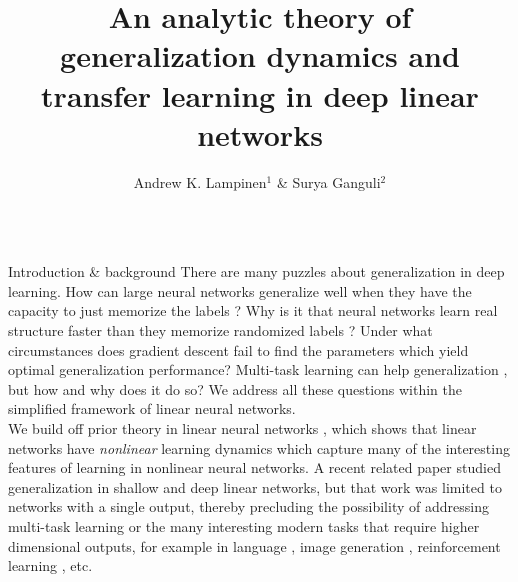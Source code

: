 \documentclass[final]{beamer}
\title{An analytic theory of generalization dynamics and transfer learning in deep linear networks}
\author{Andrew K. Lampinen$^1$ \& Surya Ganguli$^2$}
\institute{$^1$Department of Psychology, $^2$Department of Applied Physics, Stanford University}
\begin{document}

\begin{frame}[t]{}
\vspace{-1.5em}
\begin{columns}

\begin{column}[t]{0.248\textwidth}
\begin{block}{\large Introduction \& background}
\vspace{-0.5em}
There are many puzzles about generalization in deep learning. How can large neural networks generalize well when they have the capacity to just memorize the labels \citep{Zhang2016}? Why is it that neural networks learn real structure faster than they memorize randomized labels \citep{Arpit2017}? Under what circumstances does gradient descent fail to find the parameters which yield optimal generalization performance? Multi-task learning can help generalization \citep[e.g.]{Dong2015, Luong2016}, but how and why does it do so? We address all these questions within the simplified framework of linear neural networks.\\[0.5em] 
We build off prior theory in linear neural networks \citep{Saxe2013}, which shows that linear networks have \emph{nonlinear} learning dynamics which capture many of the interesting features of learning in nonlinear neural networks. A recent related paper \citep{Advani2017} studied generalization in shallow and deep linear networks, but that work was limited to networks with a single output, thereby precluding the possibility of addressing multi-task learning or the many interesting modern tasks that require higher dimensional outputs, for example in language \cite{Dong2015}, image generation \cite{Goodfellow2014}, reinforcement learning \cite{Mnih2015, Silver2016}, etc. 
\end{block}


\end{column}
\end{columns}
\end{frame}
\end{document}

